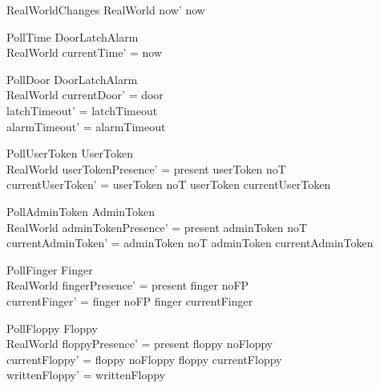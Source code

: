 \begin{schema}{RealWorldChanges}
  \Delta RealWorld
\where
  now' \geq  now
\end{schema}

\begin{schema}{PollTime}
  \Delta DoorLatchAlarm\\
  RealWorld
\where
  currentTime' = now
\end{schema}

\begin{schema}{PollDoor}
  \Delta DoorLatchAlarm\\
  RealWorld
\where
  currentDoor' = door\\
  latchTimeout' = latchTimeout\\
  alarmTimeout' = alarmTimeout
\end{schema}

\begin{schema}{PollUserToken}
  \Delta UserToken\\
  RealWorld
\where
  userTokenPresence' = present \iff  userToken \neq  noT\\
  currentUserToken' = \IF  userToken \neq  noT \THEN  userToken \ELSE  currentUserToken
\end{schema}

\begin{schema}{PollAdminToken}
  \Delta AdminToken\\
  RealWorld
\where
  adminTokenPresence' = present \iff  adminToken \neq  noT\\
  currentAdminToken' = \IF  adminToken \neq  noT \THEN  adminToken \ELSE  currentAdminToken
\end{schema}

\begin{schema}{PollFinger}
  \Delta Finger\\
  RealWorld
\where
  fingerPresence' = present \iff  finger \neq  noFP\\
  currentFinger' = \IF  finger \neq  noFP \THEN  finger \ELSE  currentFinger
\end{schema}

\begin{schema}{PollFloppy}
  \Delta Floppy\\
  RealWorld
\where
  floppyPresence' = present \iff  floppy \neq  noFloppy\\
  currentFloppy' = \IF  floppy \neq  noFloppy \THEN  floppy \ELSE  currentFloppy\\
  writtenFloppy' = writtenFloppy
\end{schema}

